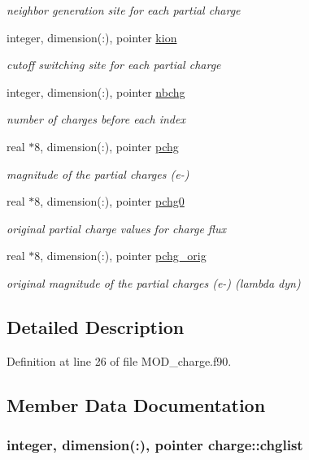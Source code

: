\begin{DoxyCompactItemize}
\begin{DoxyCompactList}\small\item\em neighbor generation site for each partial charge \end{DoxyCompactList}\item 
integer, dimension(\-:), pointer \hyperlink{classcharge_a62a899e430e111e31269a1768dd2a31c}{kion}
\begin{DoxyCompactList}\small\item\em cutoff switching site for each partial charge \end{DoxyCompactList}\item 
integer, dimension(\-:), pointer \hyperlink{classcharge_ab1c421b1f72e702793c941110a7d7bb0}{nbchg}
\begin{DoxyCompactList}\small\item\em number of charges before each index \end{DoxyCompactList}\item 
real $\ast$8, dimension(\-:), pointer \hyperlink{classcharge_a2cb76937e7223fd4b2e2e99ae6631975}{pchg}
\begin{DoxyCompactList}\small\item\em magnitude of the partial charges (e-\/) \end{DoxyCompactList}\item 
real $\ast$8, dimension(\-:), pointer \hyperlink{classcharge_aa39cba77554acd7c00e2aec7c234a2d5}{pchg0}
\begin{DoxyCompactList}\small\item\em original partial charge values for charge flux \end{DoxyCompactList}\item 
real $\ast$8, dimension(\-:), pointer \hyperlink{classcharge_aabdfa076eef62682b69ee6cc1ec5dda2}{pchg\-\_\-orig}
\begin{DoxyCompactList}\small\item\em original magnitude of the partial charges (e-\/) (lambda dyn) \end{DoxyCompactList}\end{DoxyCompactItemize}


\subsection{Detailed Description}


Definition at line 26 of file M\-O\-D\-\_\-charge.\-f90.



\subsection{Member Data Documentation}
\hypertarget{classcharge_aa135b867d77f87fcb396cb435a6bb71d}{
\subsubsection[{chglist}]{\setlength{\rightskip}{0pt plus 5cm}integer, dimension(\-:), pointer charge\-::chglist}}\label{classcharge_aa135b867d77f87fcb396cb435a6bb71d}



